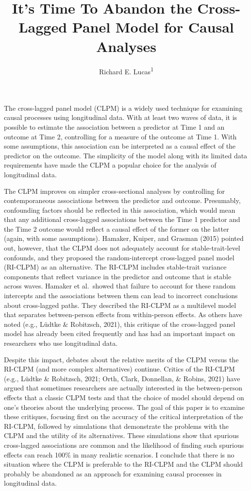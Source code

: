 \documentclass[
  english,
  man,floatsintext]{apa6}
\title{It's Time To Abandon the Cross-Lagged Panel Model for Causal Analyses}
\author{Richard E. Lucas\textsuperscript{1}}
\date{}
\affiliation{\vspace{0.5cm}\textsuperscript{1} Department of Psychology, Michigan State University}
\begin{document}
\maketitle

The cross-lagged panel model (CLPM) is a widely used technique for examining causal processes using longitudinal data. With at least two waves of data, it is possible to estimate the association between a predictor at Time 1 and an outcome at Time 2, controlling for a measure of the outcome at Time 1. With some assumptions, this association can be interpreted as a causal effect of the predictor on the outcome. The simplicity of the model along with its limited data requirements have made the CLPM a popular choice for the analysis of longitudinal data.

The CLPM improves on simpler cross-sectional analyses by controlling for contemporaneous associations between the predictor and outcome. Presumably, confounding factors should be reflected in this association, which would mean that any additional cross-lagged associations between the Time 1 predictor and the Time 2 outcome would reflect a causal effect of the former on the latter (again, with some assumptions). Hamaker, Kuiper, and Grasman (2015) pointed out, however, that the CLPM does not adequately account for stable-trait-level confounds, and they proposed the random-intercept cross-lagged panel model (RI-CLPM) as an alternative. The RI-CLPM includes stable-trait variance components that reflect variance in the predictor and outcome that is stable across waves. Hamaker et al.~showed that failure to account for these random intercepts and the associations between them can lead to incorrect conclusions about cross-lagged paths. They described the RI-CLPM as a multilevel model that separates between-person effects from within-person effects. As others have noted (e.g., Lüdtke \& Robitzsch, 2021), this critique of the cross-lagged panel model has already been cited frequently and has had an important impact on researchers who use longitudinal data.

Despite this impact, debates about the relative merits of the CLPM versus the RI-CLPM (and more complex alternatives) continue. Critics of the RI-CLPM (e.g., Lüdtke \& Robitzsch, 2021; Orth, Clark, Donnellan, \& Robins, 2021) have argued that sometimes researchers are actually interested in the between-person effects that a classic CLPM tests and that the choice of model should depend on one's theories about the underlying process. The goal of this paper is to examine these critiques, focusing first on the accuracy of the critical interpretation of the RI-CLPM, followed by simulations that demonstrate the problems with the CLPM and the utility of its alternatives. These simulations show that spurious cross-lagged associations are common and the likelihood of finding such spurious effects can reach 100\% in many realistic scenarios. I conclude that there is no situation where the CLPM is preferable to the RI-CLPM and the CLPM should probably be abandoned as an approach for examining causal processes in longitudinal data.
\end{document}
